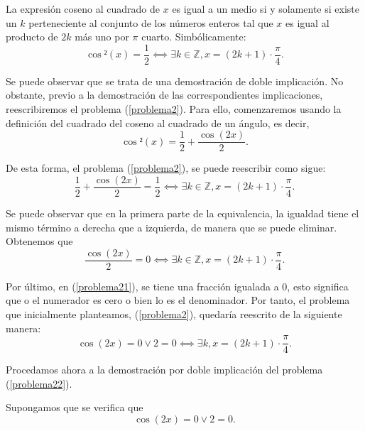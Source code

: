 \begin{lema}[SolucionCosenoCuadrado]\label{lemaCosenoCuadrado}
  La expresión coseno al
  cuadrado de \(x\) es igual a un medio si y solamente si
  existe un \(k\) perteneciente al conjunto de los números
  enteros tal que \(x\) es igual al producto de \(2k\) más
  uno por \(π\) cuarto. Simbólicamente:
  \begin{equation}\label{problema2}
    \cos²(x)=\frac{1}{2} ⟺∃ k∈ℤ, x=(2k+1)⋅\frac{π}{4}.
  \end{equation}
\end{lema}
\begin{demostracion}
  Se puede observar que se trata de una demostración de doble
  implicación. No obstante, previo a la demostración de las
  correspondientes implicaciones, reescribiremos el problema
  (\ref{problema2}). Para ello, comenzaremos usando la definición
  del cuadrado del coseno al cuadrado de un ángulo, es decir,
  \begin{equation}
    \cos²(x)=\frac{1}{2}+\frac{\cos(2x)}{2}.
  \end{equation}

  De esta forma, el problema (\ref{problema2}), se puede reescribir
  como sigue:
  \begin{equation}
    \frac{1}{2}+\frac{\cos(2x)}{2}=\frac{1}{2} ⟺∃ k∈ℤ, x=(2k+1)⋅
    \frac{π}{4}.
  \end{equation}

  Se puede observar que en la primera parte de la equivalencia, la
  igualdad tiene el mismo término a derecha que a izquierda, de
  manera que se puede eliminar. Obtenemos que
  \begin{equation}\label{problema21}
    \frac{\cos(2x)}{2}=0 ⟺ ∃ k∈ℤ, x=(2k+1)⋅\frac{π}{4}.
  \end{equation}

  Por último, en (\ref{problema21}), se tiene una fracción igualada
  a 0, esto significa que o el numerador es cero o bien lo es el
  denominador. Por tanto, el problema que inicialmente planteamos,
  (\ref{problema2}), quedaría reescrito de la siguiente manera:
  \begin{equation}\label{problema22}
    \cos(2x)=0 \lor 2=0 ⟺∃ k, x=(2k+1)⋅\frac{π}{4}.
  \end{equation}

  Procedamos ahora a la demostración por doble implicación del
  problema (\ref{problema22}).

  \noindent
  \framebox{\longrightarrow} Supongamos que se verifica que
  \begin{equation}\label{Dobleh2}\tag{h1}
    \cos(2x)=0 \lor 2=0.
  \end{equation}


\end{demostracion}
